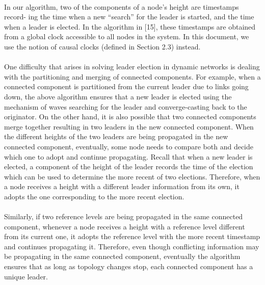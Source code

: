 \paragraph{}In our algorithm, two of the components of a node’s height are timestamps record- ing the time when a new “search” for the leader is started, and the time when a leader is elected. In the algorithm in [15], these timestamps are obtained from a global clock accessible to all nodes in the system. In this document, we use the notion of causal clocks (defined in Section 2.3) instead.
\paragraph{}One difficulty that arises in solving leader election in dynamic networks is dealing with the partitioning and merging of connected components. For example, when a connected component is partitioned from the current leader due to links going down, the above algorithm ensures that a new leader is elected using the mechanism of waves searching for the leader and converge-casting back to the originator. On the other hand, it is also possible that two connected components merge together resulting in two leaders in the new connected component. When the different heights of the two leaders are being propagated in the new connected component, eventually, some node needs to compare both and decide which one to adopt and continue propagating. Recall that when a new leader is elected, a component of the height of the leader records the time of the election which can be used to determine the more recent of two elections. Therefore, when a node receives a height with a different leader information from its own, it adopts the one corresponding to the more recent election.
\paragraph{}Similarly, if two reference levels are being propagated in the same connected component, whenever a node receives a height with a reference level different from its current one, it adopts the reference level with the more recent timestamp and continues propagating it. Therefore, even though conflicting information may be propagating in the same connected component, eventually the algorithm ensures that as long as topology changes stop, each connected component has a unique leader.
\paragraph{}
